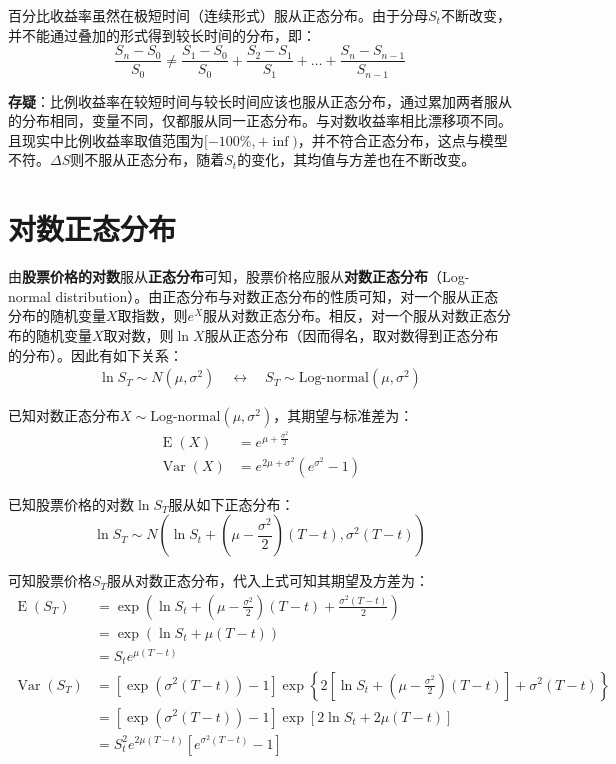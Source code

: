 \documentclass[11pt]{article}
\newcommand{\E}{\operatorname{E}}
\newcommand{\Var}{\operatorname{Var}}
\begin{document}
百分比收益率虽然在极短时间（连续形式）服从正态分布。由于分母$S_t$不断改变，并不能通过叠加的形式得到较长时间的分布，即：
\begin{equation*}
    \frac{S_n - S_0}{S_0} \neq \frac{S_1- S_0}{S_0} + \frac{S_2-S_1}{S_1} + \dots + \frac{S_{n}-S_{n-1}}{S_{n-1}}
\end{equation*}

\textbf{存疑}：比例收益率在较短时间与较长时间应该也服从正态分布，通过累加两者服从的分布相同，变量不同，仅都服从同一正态分布。与对数收益率相比漂移项不同。且现实中比例收益率取值范围为$[-100\%,+\inf)$，并不符合正态分布，这点与模型不符。$\Delta S$则不服从正态分布，随着$S_t$的变化，其均值与方差也在不断改变。

\section{对数正态分布}

由\textbf{股票价格的对数}服从\textbf{正态分布}可知，股票价格应服从\textbf{对数正态分布}（Log-normal distribution）。由正态分布与对数正态分布的性质可知，对一个服从正态分布的随机变量$X$取指数，则$e^X$服从对数正态分布。相反，对一个服从对数正态分布的随机变量$X$取对数，则$\ln X$服从正态分布（因而得名，取对数得到正态分布的分布）。因此有如下关系：
\begin{align*}
    \ln S_T \sim N(\mu,\sigma^2) \quad \leftrightarrow \quad S_T \sim \text{Log-normal}(\mu,\sigma^2)
\end{align*}

已知对数正态分布$X \sim \text{Log-normal}(\mu,\sigma^2)$，其期望与标准差为：
\begin{align*}
    \E(X) & = e^{\mu+\frac{\sigma^2}{2}} \\
    \Var(X) & = e^{2\mu+\sigma^2} (e^{\sigma^2}-1)
\end{align*}

已知股票价格的对数$\ln S_T$服从如下正态分布：
\begin{equation*}
    \ln S_T  \sim N \left(\ln S_t + (\mu-\frac{\sigma^2}{2})(T-t), \sigma^2(T-t)\right)
\end{equation*}

可知股票价格$S_T$服从对数正态分布，代入上式可知其期望及方差为：
\begin{align*}
    \E(S_T)   & = \exp\left( \ln S_t + (\mu - \frac{\sigma^2}{2})(T-t)+\frac{\sigma^2(T-t)}{2}\right) \\
    & = \exp \left( \ln S_t + \mu(T-t) \right) \\
    & = S_t e^{\mu(T-t)} \\
    \Var(S_T) & = \left[\exp(\sigma^2(T-t))-1\right] \exp \left\{2\left[\ln S_t + (\mu - \frac{\sigma^2}{2})(T-t)\right] + \sigma^2(T-t)\right\} \\
    & = \left[\exp(\sigma^2(T-t))-1\right] \exp\left[2 \ln S_t + 2\mu (T-t)\right] \\
    & = S_t^2 e^{2\mu(T-t)} \left[ e^{\sigma^2 (T-t)} - 1 \right]
\end{align*}
\end{document}
